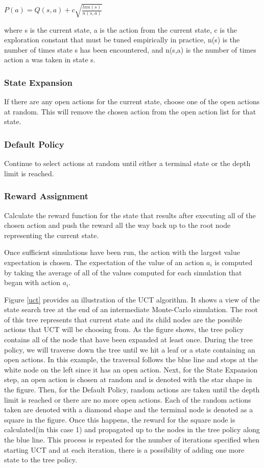 $P(a) = Q(s,a) + c\sqrt{\frac{ln n(s)}{n(s,a)}}$

where s is the current state, a is the action from the current state, c is the exploration constant that must be tuned empirically in practice, n(s) is the number of times state s has been encountered, and n(s,a) is the number of times action a was taken in state s.

\subsubsection{State Expansion}
If there are any open actions for the current state, choose one of the open actions at random.  This will remove the chosen action from the open action list for that state.

\subsubsection{Default Policy}
Continue to select actions at random until either a terminal state or the depth limit is reached.

\subsubsection{Reward Assignment}
Calculate the reward function for the state that results after executing all of the chosen action and push the reward all the way back up to the root node representing the current state.

Once sufficient simulations have been run, the action with the largest value expectation is chosen.  The expectation of the value of an action $a_i$ is computed by taking the average of all of the values computed for each simulation that began with action $a_i$.

Figure \ref{uct} provides an illustration of the UCT algorithm.  It shows a view of the state search tree at the end of an intermediate Monte-Carlo simulation.  The root of this tree represents that current state and its child nodes are the possible actions that UCT will be choosing from.  As the figure shows, the tree policy contains all of the node that have been expanded at least once.  During the tree policy, we will traverse down the tree until we hit a leaf or a state containing an open actions.  In this example, the traversal follows the blue line and stops at the white node on the left since it has an open action.  Next, for the State Expansion step, an open action is chosen at random and is denoted with the star shape in the figure.  Then, for the Default Policy, random actions are taken until the depth limit is reached or there are no more open actions.  Each of the random actions taken are denoted with a diamond shape and the terminal node is denoted as a square in the figure.  Once this happens, the reward for the square node is calculated(in this case 1) and propagated up to the nodes in the tree policy along the blue line.  This process is repeated for the number of iterations specified when starting UCT and at each iteration, there is a possibility of adding  one more state to the tree policy.


